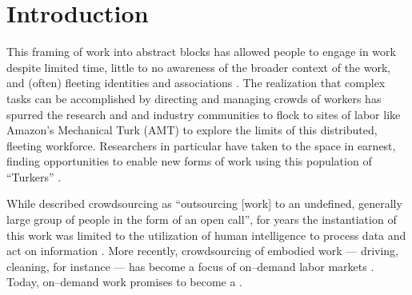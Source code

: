 \documentclass[trackingWork]{subfiles}
\begin{document}
\section{Introduction}
This framing of work into abstract blocks
has allowed people to engage in work despite
limited time,
little to no awareness of the broader context of the work, and 
(often) fleeting identities and associations
\cite{kargerIterativeLearning,mitraComparingStrategies,latozaCrowdDev}.
The realization
that complex tasks can be accomplished by directing and managing crowds of workers
has spurred the research and and industry communities to flock to sites of labor
like Amazon's Mechanical Turk (AMT)
to explore the limits of this distributed, fleeting workforce.
Researchers in particular have taken to the space in earnest,
finding opportunities to enable new forms of work
using this population of ``Turkers''
\cite{bernsteinSoylent,redballoon,paolacci2010running}.

While \citeauthor{howe2008crowdsourcing} described crowdsourcing as
``outsourcing [work] to an undefined, generally large group of people in the form of an open call'',
for years the instantiation of this work was limited to the utilization of
human intelligence to process data and act on information
\cite{CrowdsourcingUserStudies,movieSummarizationWu,
      yuenSurvey,geiger2011managing,quinnbedersonTaxonomy}.
More recently, crowdsourcing of embodied work
--- driving, cleaning, for instance ---
has become a focus of on--demand labor markets
\cite{uberAlgorithm,uberOfficial,zaarlyOfficial,taskrabbitOfficial}.
Today, on--demand work promises to become a 
.

\end{document}

